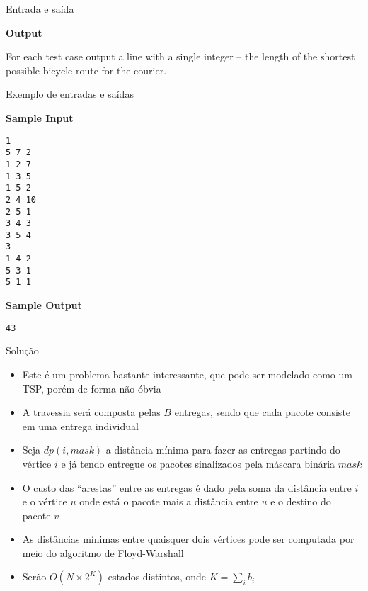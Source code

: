 \begin{frame}[fragile]{Entrada e saída}

\textbf{Output}

For each test case output a line with a single integer -- the length of the shortest possible 
bicycle route for the courier.

\end{frame}

\begin{frame}[fragile]{Exemplo de entradas e saídas}

\begin{minipage}[t]{0.45\textwidth}
\textbf{Sample Input}
\begin{verbatim}
1
5 7 2
1 2 7
1 3 5
1 5 2
2 4 10
2 5 1
3 4 3
3 5 4
3
1 4 2
5 3 1
5 1 1
\end{verbatim}
\end{minipage}
\begin{minipage}[t]{0.5\textwidth}
\textbf{Sample Output}
\begin{verbatim}
43
\end{verbatim}
\end{minipage}
\end{frame}

\begin{frame}[fragile]{Solução}

    \begin{itemize}
        \item Este é um problema bastante interessante, que pode ser modelado como um TSP, porém
            de forma não óbvia

        \item A travessia será composta pelas $B$ entregas, sendo que cada pacote consiste em
            uma entrega individual

        \item Seja $dp(i, mask)$ a distância mínima para fazer as entregas partindo do vértice
            $i$ e já tendo entregue os pacotes sinalizados pela máscara binária $mask$

        \item O custo das ``arestas'' entre as entregas é dado pela soma da distância entre $i$
            e o vértice $u$ onde está o pacote mais a distância entre $u$ e o destino do pacote
            $v$

        \item As distâncias mínimas entre quaisquer dois vértices pode ser computada por meio
            do algoritmo de Floyd-Warshall

        \item Serão $O(N\times 2^K)$ estados distintos, onde $K = \sum_i b_i$
    \end{itemize}

\end{frame}

